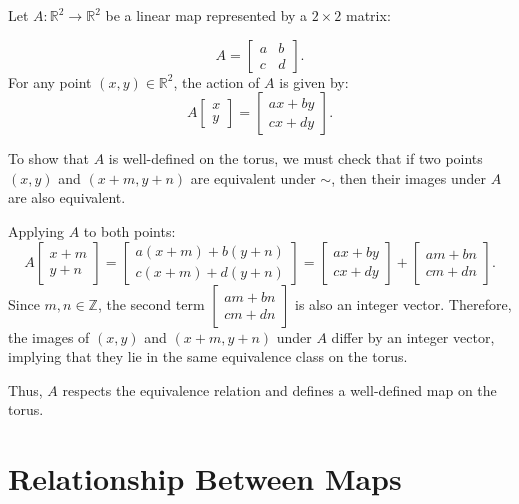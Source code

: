 \documentclass[11pt]{article}
\begin{document}
Let \(A: \mathbb{R}^2 \to \mathbb{R}^2\) be a linear map represented by a \(2 \times 2\) matrix:

\[
A = \begin{bmatrix}
  a & b \\
  c & d
\end{bmatrix}.
\]
For any point \((x, y) \in \mathbb{R}^2\), the action of \(A\) is given by:
\[
A \begin{bmatrix} x \\ y \end{bmatrix} = \begin{bmatrix}
  ax + by \\
  cx + dy
\end{bmatrix}.
\]

To show that \(A\) is well-defined on the torus, we must check that if two points \((x, y)\) and \((x + m, y + n)\) are equivalent under \(\sim\), then their images under \(A\) are also equivalent.

Applying \(A\) to both points:
\[
A \begin{bmatrix} x + m \\ y + n \end{bmatrix} = \begin{bmatrix} a(x + m) + b(y + n) \\ c(x + m) + d(y + n) \end{bmatrix} = \begin{bmatrix} ax + by \\ cx + dy \end{bmatrix} + \begin{bmatrix} am + bn \\ cm + dn \end{bmatrix}.
\]
Since \(m, n \in \mathbb{Z}\), the second term \(\begin{bmatrix} am + bn \\ cm + dn \end{bmatrix}\) is also an integer vector. Therefore, the images of \((x, y)\) and \((x + m, y + n)\) under \(A\) differ by an integer vector, implying that they lie in the same equivalence class on the torus.

Thus, \(A\) respects the equivalence relation and defines a well-defined map on the torus.

\section{Relationship Between Maps}
\label{sec:org65294d4}
\end{document}
